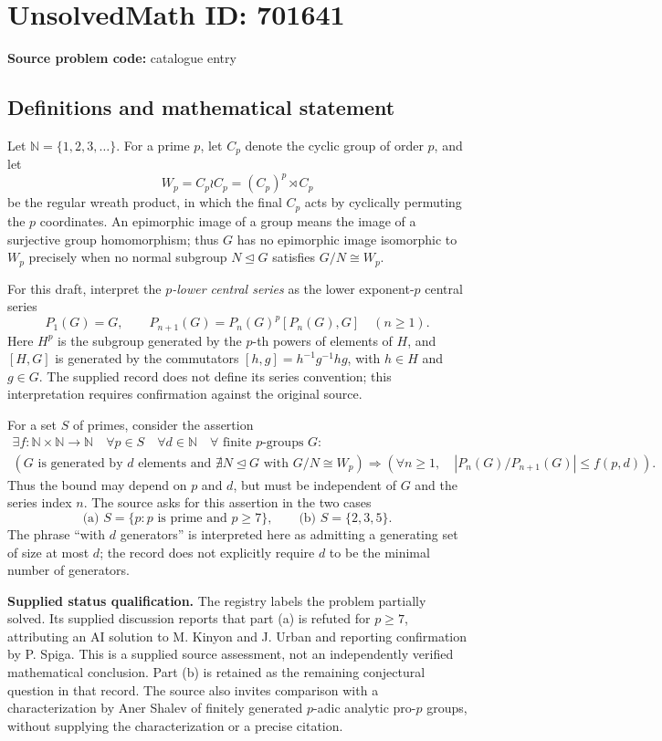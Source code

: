 \documentclass[11pt]{article}
\newcommand{\N}{\mathbb{N}}
\begin{document}
\section*{UnsolvedMath ID: 701641}
\textbf{Source problem code:} catalogue entry
\subsection{Definitions and mathematical statement}
Let \(\N=\{1,2,3,\ldots\}\). For a prime \(p\), let \(C_p\) denote the cyclic group of order \(p\), and let
\[
W_p=C_p\wr C_p=(C_p)^p\rtimes C_p
\]
be the regular wreath product, in which the final \(C_p\) acts by cyclically permuting the \(p\) coordinates. An epimorphic image of a group means the image of a surjective group homomorphism; thus \(G\) has no epimorphic image isomorphic to \(W_p\) precisely when no normal subgroup \(N\trianglelefteq G\) satisfies \(G/N\cong W_p\).

For this draft, interpret the \emph{\(p\)-lower central series} as the lower exponent-\(p\) central series
\[
P_1(G)=G,\qquad P_{n+1}(G)=P_n(G)^p[P_n(G),G]\quad(n\geq1).
\]
Here \(H^p\) is the subgroup generated by the \(p\)-th powers of elements of \(H\), and \([H,G]\) is generated by the commutators \([h,g]=h^{-1}g^{-1}hg\), with \(h\in H\) and \(g\in G\). The supplied record does not define its series convention; this interpretation requires confirmation against the original source.

For a set \(S\) of primes, consider the assertion
\[
\begin{gathered}
\exists f:\N\times\N\longrightarrow\N\quad
\forall p\in S\quad\forall d\in\N\quad
\forall\text{ finite }p\text{-groups }G:\\
\left( G\text{ is generated by }d\text{ elements and }
\nexists N\trianglelefteq G\text{ with }G/N\cong W_p\right)
\Longrightarrow
\left(\forall n\geq1,\quad
|P_n(G)/P_{n+1}(G)|\leq f(p,d)\right).
\end{gathered}
\]
Thus the bound may depend on \(p\) and \(d\), but must be independent of \(G\) and the series index \(n\). The source asks for this assertion in the two cases
\[
\text{(a) }S=\{p:p\text{ is prime and }p\geq7\},
\qquad
\text{(b) }S=\{2,3,5\}.
\]
The phrase ``with \(d\) generators'' is interpreted here as admitting a generating set of size at most \(d\); the record does not explicitly require \(d\) to be the minimal number of generators.

\textbf{Supplied status qualification.} The registry labels the problem partially solved. Its supplied discussion reports that part (a) is refuted for \(p\geq7\), attributing an AI solution to M. Kinyon and J. Urban and reporting confirmation by P. Spiga. This is a supplied source assessment, not an independently verified mathematical conclusion. Part (b) is retained as the remaining conjectural question in that record. The source also invites comparison with a characterization by Aner Shalev of finitely generated \(p\)-adic analytic pro-\(p\) groups, without supplying the characterization or a precise citation.
\end{document}
